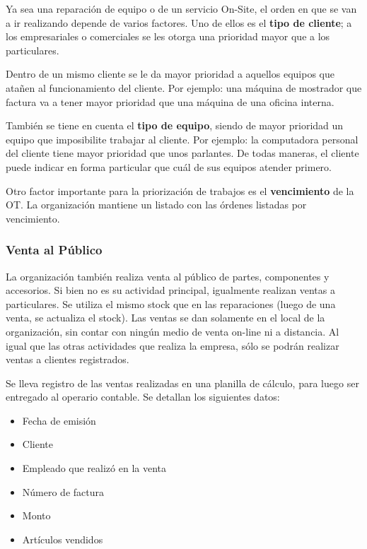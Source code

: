 \documentclass[12pt]{extarticle}
\begin{document}
\begin{spacing}{1.2}
        Ya sea una reparación de equipo o de un servicio On-Site, el orden en que se van a ir realizando depende de varios factores. Uno de ellos es el \textbf{tipo de cliente}; a los empresariales o comerciales se les otorga una prioridad mayor que a los particulares.

        Dentro de un mismo cliente se le da mayor prioridad a aquellos equipos que atañen al funcionamiento del cliente. Por ejemplo: una máquina de mostrador que factura va a tener mayor prioridad que una máquina de una oficina interna.

        También se tiene en cuenta el \textbf{tipo de equipo}, siendo de mayor prioridad un equipo que imposibilite trabajar al cliente. Por ejemplo: la computadora personal del cliente tiene mayor prioridad que unos parlantes.
        De todas maneras, el cliente puede indicar en forma particular que cuál de sus equipos atender primero.

        Otro factor importante para la priorización de trabajos es el \textbf{vencimiento} de la OT. La organización mantiene un listado con las órdenes listadas por vencimiento.

        \subsubsection{Venta al Público}
        La organización también realiza venta al público de partes, componentes y accesorios. Si bien no es su actividad principal, igualmente realizan ventas a particulares. Se utiliza el mismo stock que en las reparaciones (luego de una venta, se actualiza el stock). 
        Las ventas se dan solamente en el local de la organización, sin contar con ningún medio de venta on-line ni a distancia. Al igual que las otras actividades que realiza la empresa, sólo se podrán realizar ventas a clientes registrados.

        Se lleva registro de las ventas realizadas en una planilla de cálculo, para luego ser entregado al operario contable. Se detallan los siguientes datos:
        \begin{itemize}
            \item Fecha de emisión
            \item Cliente
            \item Empleado que realizó en la venta
            \item Número de factura
            \item Monto
            \item Artículos vendidos
        \end{itemize}


\end{spacing}
\end{document}
